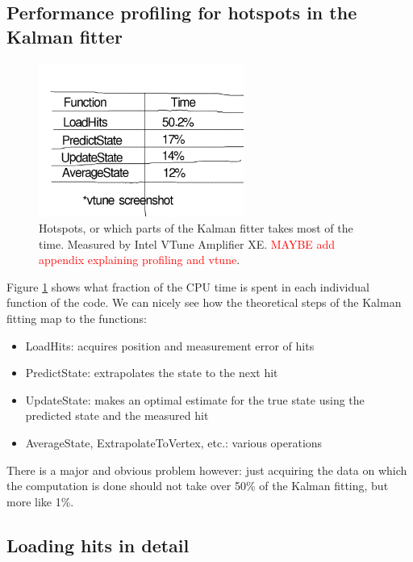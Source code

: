 \documentclass[12pt]{article}
\begin{document}
\subsection{Performance profiling for hotspots in the Kalman fitter}


\begin{figure}[H]
	\begin{center}
		\includegraphics[width=0.6\textwidth]{kalmanfit_overall_breakdown}
	\end{center}
	\caption{Hotspots, or which parts of the Kalman fitter takes most of the time. Measured by Intel VTune Amplifier XE. \textcolor{red}{MAYBE add appendix explaining profiling and vtune}.}
	\label{fig_kalman_vtune_initial}
\end{figure}

Figure \ref{fig_kalman_vtune_initial} shows what fraction of the CPU time is spent in each individual function of the code. We can nicely see how the theoretical steps of the Kalman fitting map to the functions:
\begin{itemize}
	\item LoadHits: acquires position and measurement error of hits
	\item PredictState: extrapolates the state to the next hit
	\item UpdateState: makes an optimal estimate for the true state using the predicted state and the measured hit
	\item AverageState, ExtrapolateToVertex, etc.: various operations
\end{itemize}
There is a major and obvious problem however: just acquiring the data on which the computation is done should not take over 50\% of the Kalman fitting, but more like 1\%.	

\subsection{Loading hits in detail}
\end{document}
